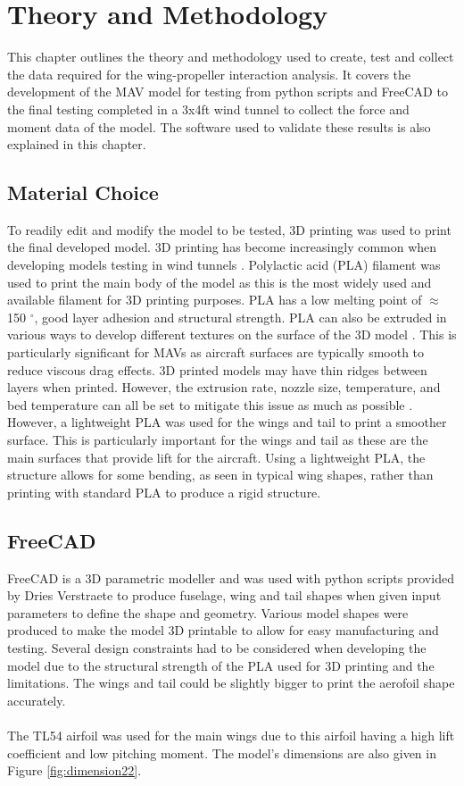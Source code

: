 \graphicspath{{./Figs/}}

\chapter{Theory and Methodology}
This chapter outlines the theory and methodology used to create, test and collect the data required for the wing-propeller interaction analysis. It covers the development of the MAV model for testing from python scripts and FreeCAD to the final testing completed in a 3x4ft wind tunnel to collect the force and moment data of the model. The software used to validate these results is also explained in this chapter. 

\section{Material Choice}
To readily edit and modify the model to be tested, 3D printing was used to print the final developed model. 3D printing has become increasingly common when developing models testing in wind tunnels \cite{Szwedziak2022}. Polylactic acid (PLA) filament was used to print the main body of the model as this is the most widely used and available filament for 3D printing purposes. PLA has a low melting point of $\approx$ 150 $^{\circ}$, good layer adhesion and structural strength. PLA can also be extruded in various ways to develop different textures on the surface of the 3D model \cite{Butt2021}. This is particularly significant for MAVs as aircraft surfaces are typically smooth to reduce viscous drag effects. 3D printed models may have thin ridges between layers when printed. However, the extrusion rate, nozzle size, temperature, and bed temperature can all be set to mitigate this issue as much as possible \cite{Butt2021} \cite{Olasek2014}. However, a lightweight PLA was used for the wings and tail to print a smoother surface. This is particularly important for the wings and tail as these are the main surfaces that provide lift for the aircraft. Using a lightweight PLA, the structure allows for some bending, as seen in typical wing shapes, rather than printing with standard PLA to produce a rigid structure. 


\section{FreeCAD}
FreeCAD is a 3D parametric modeller and was used with python scripts provided by Dries Verstraete to produce fuselage, wing and tail shapes when given input parameters to define the shape and geometry. Various model shapes were produced to make the model 3D printable to allow for easy manufacturing and testing. Several design constraints had to be considered when developing the model due to the structural strength of the PLA used for 3D printing and the limitations. The wings and tail could be slightly bigger to print the aerofoil shape accurately.\\
\\ The TL54 airfoil was used for the main wings due to this airfoil having a high lift coefficient and low pitching moment. The model's dimensions are also given in Figure \ref{fig:dimension22}.

